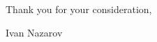 \documentclass[12pt]{letter}
\begin{document}

\hfill Thank you for your consideration,\par%
\hfill Ivan Nazarov
\end{document}
